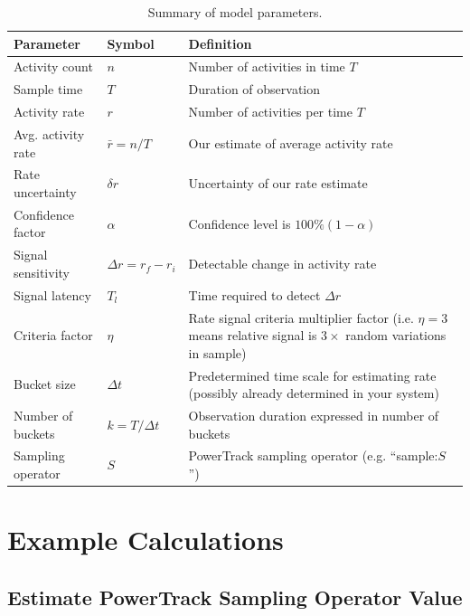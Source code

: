 \documentclass{article}
\begin{document}
%
\begin{table} [!h]
    \begin{tabular}{p{3.0cm}| p{1.9cm}|p{5.9cm}}
     \hline
Parameter  & Symbol & Definition \\
\hline	
Activity count & $n$ & Number of activities in time $T$\\
Sample time & $T$	& Duration of observation\\
Activity rate & $r$	& Number of activities per time $T$\\
Avg. activity rate & $\bar{r} = n/T$ & Our estimate of average activity rate \\
Rate uncertainty & $\delta r$	& Uncertainty of our rate estimate \\
Confidence factor & $\alpha$ & Confidence level is $100\% (1-\alpha)$\\
Signal sensitivity & $\Delta r=r_{f}-r_{i}$ & Detectable change in activity rate \\
Signal latency & $T_l$ & Time required to detect $\Delta r$  \\
Criteria factor & $\eta$ & Rate signal criteria multiplier factor (i.e. $\eta = 3$ means 
	relative signal is $3 \times$ random variations in sample) \\
Bucket size & $\Delta t$ & Predetermined time scale for estimating rate (possibly already determined in your system)\\
Number of buckets & $k=T/\Delta t$ & Observation duration expressed in number of buckets \\
Sampling operator & $S$	& PowerTrack sampling operator (e.g. ``sample:$S$'') \\
\hline
\end{tabular}
\caption{Summary of model parameters.}
\label{tab:summary}
\end{table}
%


\section{Example Calculations} 
\label{examples}



\subsection{Estimate PowerTrack Sampling Operator Value} 
\label{ex:1}
\end{document}
